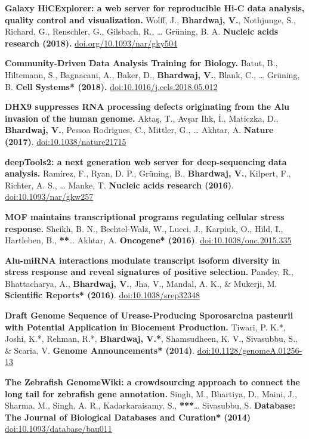 \documentclass[11pt,twoside]{MPIthesis}
\theoremstyle{definition}
\theoremstyle{definition}
\theoremstyle{definition}
\theoremstyle{remark}
\begin{document}
\textbf{Galaxy HiCExplorer: a web server for reproducible Hi-C data
analysis, quality control and visualization.} Wolff, J.,
\textbf{Bhardwaj, V.}, Nothjunge, S., Richard, G., Renschler, G.,
Gilsbach, R., \ldots{} Grüning, B. A. \textbf{Nucleic acids research
(2018).}
\href{http://doi.org/10.1093/nar/gky504}{{doi.org/10.1093/nar/gky504}}

\textbf{Community-Driven Data Analysis Training for Biology.} Batut, B.,
Hiltemann, S., Bagnacani, A., Baker, D., \textbf{Bhardwaj, V.}, Blank,
C., \ldots{} Grüning, B. \textbf{Cell Systems* (2018).}
\href{https://doi.org/10.1016/j.cels.2018.05.012}{{doi:10.1016/j.cels.2018.05.012}}

\textbf{DHX9 suppresses RNA processing defects originating from the Alu
invasion of the human genome.} Aktaş, T., Avşar Ilık, İ., Maticzka, D.,
\textbf{Bhardwaj, V.}, Pessoa Rodrigues, C., Mittler, G., \ldots{}
Akhtar, A. \textbf{Nature (2017)}.
\href{https://www.nature.com/articles/nature21715}{{doi:10.1038/nature21715}}

\textbf{deepTools2: a next generation web server for deep-sequencing
data analysis.} Ramírez, F., Ryan, D. P., Grüning, B., \textbf{Bhardwaj,
V.}, Kilpert, F., Richter, A. S., \ldots{} Manke, T. \textbf{Nucleic
acids research (2016)}.
\href{http://dx.doi.org/10.1093/nar/gku365}{{doi:10.1093/nar/gkw257}}

\textbf{MOF maintains transcriptional programs regulating cellular
stress response.} Sheikh, B. N., Bechtel-Walz, W., Lucci, J., Karpiuk,
O., Hild, I., Hartleben, B., \textbf{**}\ldots{} Akhtar, A.
\textbf{Oncogene* (2016)}.
\href{https://doi.org/10.1038/onc.2015.335}{{doi:10.1038/onc.2015.335}}

\textbf{Alu-miRNA interactions modulate transcript isoform diversity in
stress response and reveal signatures of positive selection.} Pandey,
R., Bhattacharya, A., \textbf{Bhardwaj, V.}, Jha, V., Mandal, A. K., \&
Mukerji, M. \textbf{Scientific Reports* (2016)}.
\href{http://dx.doi.org/10.1038/srep32348}{{doi:10.1038/srep32348}}

\textbf{Draft Genome Sequence of Urease-Producing Sporosarcina pasteurii
with Potential Application in Biocement Production.} Tiwari, P. K.*,
Joshi, K.*, Rehman, R.*, \textbf{Bhardwaj, V.*}, Shamsudheen, K. V.,
Sivasubbu, S., \& Scaria, V. \textbf{Genome Announcements* (2014)}.
\href{https://doi.org/10.1128/genomeA.01256-13}{{doi:10.1128/genomeA.01256-13}}

\textbf{The Zebrafish GenomeWiki: a crowdsourcing approach to connect
the long tail for zebrafish gene annotation.} Singh, M., Bhartiya, D.,
Maini, J., Sharma, M., Singh, A. R., Kadarkaraisamy, S.,
\textbf{***}\ldots{} Sivasubbu, S. \textbf{Database: The Journal of
Biological Databases and Curation* (2014)}
\href{https://doi.org/10.1093/database/bau011}{{doi:10.1093/database/bau011}}
\end{document}
